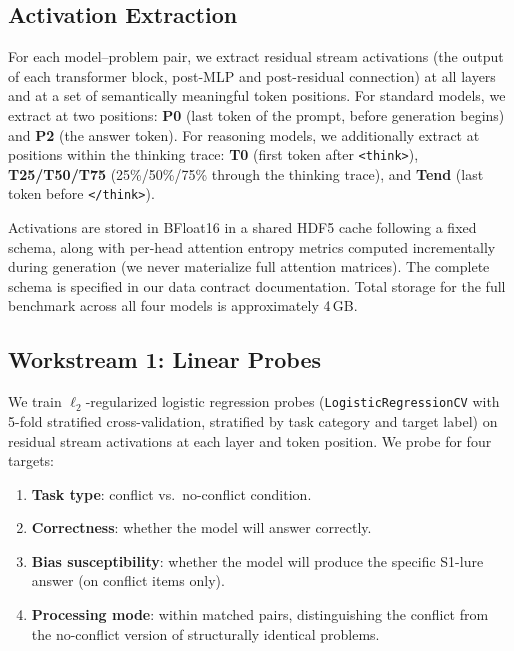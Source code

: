 \subsection{Activation Extraction}
\label{sec:extraction}

For each model--problem pair, we extract residual stream activations (the
output of each transformer block, post-MLP and post-residual connection) at
all layers and at a set of semantically meaningful token positions.  For
standard models, we extract at two positions: \textbf{P0} (last token of the
prompt, before generation begins) and \textbf{P2} (the answer token).
For reasoning models, we additionally extract at positions within the
thinking trace: \textbf{T0} (first token after \texttt{<think>}),
\textbf{T25/T50/T75} (25\%/50\%/75\% through the thinking trace), and
\textbf{Tend} (last token before \texttt{</think>}).

Activations are stored in BFloat16 in a shared HDF5 cache following a
fixed schema, along with per-head attention entropy metrics computed
incrementally during generation (we never materialize full attention
matrices).  The complete schema is specified in our data contract
documentation.  Total storage for the full benchmark across all four models
is approximately 4\,GB.

\subsection{Workstream 1: Linear Probes}
\label{sec:probes}

We train $\ell_2$-regularized logistic regression probes
(\texttt{LogisticRegressionCV} with 5-fold stratified cross-validation,
stratified by task category and target label) on residual stream activations
at each layer and token position.  We probe for four targets:

\begin{enumerate}[leftmargin=*,itemsep=1pt]
  \item \textbf{Task type}: conflict vs.\ no-conflict condition.
  \item \textbf{Correctness}: whether the model will answer correctly.
  \item \textbf{Bias susceptibility}: whether the model will produce the
  specific S1-lure answer (on conflict items only).
  \item \textbf{Processing mode}: within matched pairs, distinguishing the
  conflict from the no-conflict version of structurally identical problems.
\end{enumerate}

